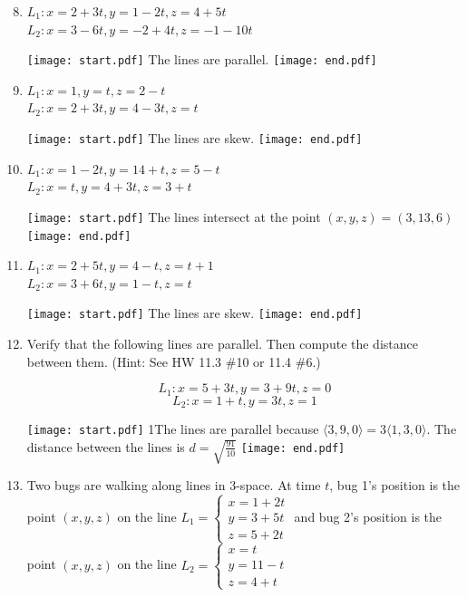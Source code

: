 \documentclass[12pt]{article}
\begin{document}
\begin{enumerate}
\setcounter{enumi}{7}

\item $L_1: x=2+3t, y=1-2t, z=4+5t$\\
$L_2: x=3-6t, y=-2+4t, z=-1-10t$

\texttt{[image: start.pdf]}
{{The lines are parallel.}}
\texttt{[image: end.pdf]}


\item $L_1: x=1, y=t, z=2-t$\\
$L_2: x=2+3t, y=4-3t, z=t$

\texttt{[image: start.pdf]}
{{The lines are skew.}}
\texttt{[image: end.pdf]}


\item $L_1: x=1-2t, y=14+t, z=5-t$\\
$L_2: x=t, y=4+3t, z=3+t$

\texttt{[image: start.pdf]}
{{The lines intersect at the point $(x,y,z)=(3,13,6)$}}
\texttt{[image: end.pdf]}


\item $L_1: x=2+5t, y=4-t, z=t+1$\\
$L_2: x=3+6t, y=1-t, z=t$

\texttt{[image: start.pdf]}
{{The lines are skew.}}
\texttt{[image: end.pdf]}


\item Verify that the following lines are parallel.  Then compute the distance between them. (Hint: See HW 11.3 \#10 or 11.4 \#6.)

$$L_1: x=5+3t, y=3+9t, z=0$$
$$L_2: x=1+t, y=3t, z=1$$

\texttt{[image: start.pdf]}
{{{1\linewidth}{The lines are parallel because $\langle 3,9,0\rangle=3\langle1,3,0\rangle$.  The distance between the lines is $d=\sqrt{\frac{91}{10}}$}}}
\texttt{[image: end.pdf]}


\item Two bugs are walking along lines in 3-space.  At time $t$, bug 1's position is the point $(x,y,z)$ on the line $L_1=\left\{\begin{array}{l}
x=1+2t\\
y=3+5t\\
z=5+2t\end{array}\right.$ and bug 2's position is the point $(x,y,z)$ on the line $L_2=\left\{\begin{array}{l}
x=t\\
y=11-t\\
z=4+t\end{array}\right.$


\end{enumerate}
\end{document}
